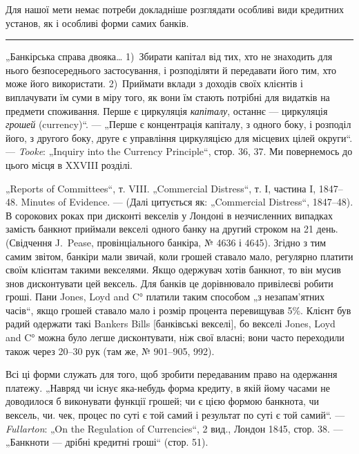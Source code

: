 Для нашої мети немає потреби докладніше розглядати особливі види кредитних установ, як і особливі
форми самих банків.

\pfbreak{}

„Банкірська справа двояка\dots{} 1)~Збирати капітал від тих, хто не знаходить
для нього безпосереднього застосування, і розподіляти й передавати його
тим, хто може його використати. 2)~Приймати вклади з доходів своїх клієнтів
і виплачувати їм суми в міру того, як вони їм стають потрібні для видатків
на предмети споживання. Перше є циркуляція \emph{капіталу}, останнє — циркуляція
\emph{грошей} (currency)“. — „Перше є концентрація капіталу, з одного боку, і розподіл його, з другого
боку, друге є управління циркуляцією для місцевих
цілей округи“. — \emph{Tooke}: „Inquiry into the Currency Principle“, стор. 36, 37. Ми
повернемось до цього місця в XXVIII розділі.

„Reports of Committees“, т. VIII. „Commercial Distress“, т. І, частина I, 1847--48.
Minutes of Evidence. — (Далі цитується як: „Commercial Distress“, 1847--48). В сорокових роках при
дисконті векселів у Лондоні в незчисленних випадках замість банкнот приймали векселі одного банку на
другий строком на 21 день.
(Свідчення J.~Pease, провінціального банкіра, № 4636 і 4645). Згідно з тим самим звітом, банкіри
мали звичай, коли грошей ставало мало, регулярно платити
своїм клієнтам такими векселями. Якщо одержувач хотів банкнот, то він мусив
знов дисконтувати цей вексель. Для банків це дорівнювало привілеєві робити
гроші. Пани Jones, Loyd and C° платили таким способом „з незапам’ятних часів“,
якщо грошей ставало мало і розмір процента перевищував 5\%. Клієнт був
радий одержати такі Bankers Bills [банківські векселі], бо векселі Jones, Loyd
and C° можна було легше дисконтувати, ніж свої власні; вони часто переходили також через 20--30 рук
(там же, № 901--905, 992).

Всі ці форми служать для того, щоб зробити передаваним право на одержання платежу. „Навряд чи існує
яка-небудь форма кредиту, в якій йому часами
не доводилося б виконувати функції грошей; чи є цією формою банкнота, чи
вексель, чи. чек, процес по суті є той самий і результат по суті є той самий“. — \emph{Fullarton}: „On the
Regulation of Currencies“, 2 вид., Лондон 1845, стор. 38. — „Банкноти — дрібні кредитні гроші“
(стор. 51).

